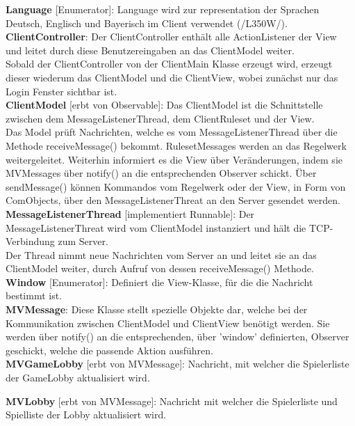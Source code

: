 \documentclass{article}
\begin{document}
\textbf{Language} [Enumerator]: Language wird zur representation der Sprachen Deutsch, Englisch und Bayerisch im Client verwendet (/L350W/). \\

\textbf{ClientController}: Der ClientController enthält alle ActionListener der View und leitet durch diese Benutzereingaben an das ClientModel weiter.\\
Sobald der ClientController von der ClientMain Klasse erzeugt wird, erzeugt dieser wiederum das ClientModel und die ClientView, wobei zunächst nur das Login Fenster sichtbar ist. \\

\textbf{ClientModel} [erbt von Observable]: Das ClientModel ist die Schnittstelle zwischen dem MessageListenerThread, dem ClientRuleset und der View.\\ 
Das Model prüft Nachrichten, welche es vom MessageListenerThread über die Methode receiveMessage() bekommt. RulesetMessages werden an das Regelwerk weitergeleitet. Weiterhin informiert es die View über Veränderungen, indem sie MVMessages über notify() an die entsprechenden Observer schickt. Über sendMessage() können Kommandos vom Regelwerk oder der View, in Form von ComObjects, über den MessageListenerThreat an den Server gesendet werden.\\

\textbf{MessageListenerThread} [implementiert Runnable]: Der MessageListenerThreat wird vom ClientModel instanziert und hält die TCP-Verbindung zum Server. \\
Der Thread nimmt neue Nachrichten vom Server an und leitet sie an das ClientModel weiter, durch Aufruf von dessen receiveMessage() Methode.\\

\textbf{Window} [Enumerator]: Definiert die View-Klasse, für die die Nachricht bestimmt ist. \\

\textbf{MVMessage}: Diese Klasse stellt spezielle Objekte dar, welche bei der Kommunikation zwischen ClientModel und ClientView benötigt werden. Sie werden über notify() an die entsprechenden, über 'window' definierten, Observer geschickt, welche die passende Aktion ausführen. \\

\textbf{MVGameLobby} [erbt von MVMessage]: Nachricht, mit welcher die Spielerliste der GameLobby aktualisiert wird.

\textbf{MVLobby} [erbt von MVMessage]: Nachricht mit welcher die Spielerliste und Spielliste der Lobby aktualisiert wird.
\end{document}
